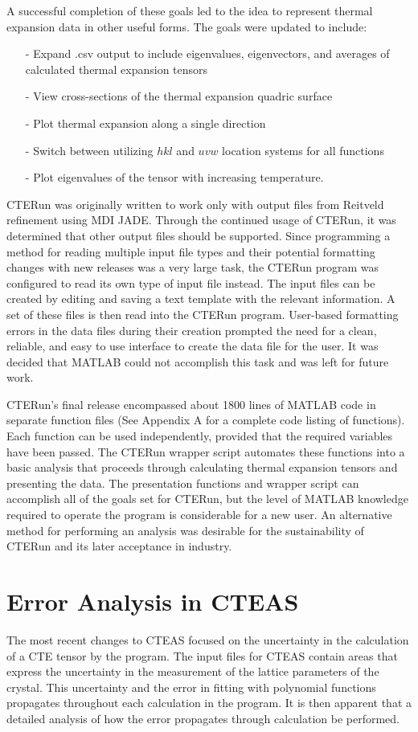 A successful completion of these goals led to the idea to represent thermal expansion data in other useful forms.  The goals were updated to include:
\begin{itemize}
 \item[-] Expand .csv output to include eigenvalues, eigenvectors, and averages of calculated thermal expansion tensors
 \item[-] View cross-sections of the thermal expansion quadric surface
 \item[-] Plot thermal expansion along a single direction
 \item[-] Switch between utilizing $hkl$ and $uvw$ location systems for all functions
 \item[-] Plot eigenvalues of the tensor with increasing temperature.
\end{itemize}

CTERun was originally written to work only with output files from Reitveld refinement using MDI JADE.  Through the continued usage of CTERun, it was determined that other output files should be supported.  Since programming a method for reading multiple input file types and their potential formatting changes with new releases was a very large task, the CTERun program was configured to read its own type of input file instead.  The input files can be created by editing and saving a text template with the relevant information.  A set of these files is then read into the CTERun program.  User-based formatting errors in the data files during their creation prompted the need for a clean, reliable, and easy to use interface to create the data file for the user.  It was decided that MATLAB could not accomplish this task and was left for future work.

CTERun's final release encompassed about 1800 lines of MATLAB code in separate function files (See Appendix A for a complete code listing of functions).  Each function can be used independently, provided that the required variables have been passed.  The CTERun wrapper script automates these functions into a basic analysis that proceeds through calculating thermal expansion tensors and presenting the data.  The presentation functions and wrapper script can accomplish all of the goals set for CTERun, but the level of MATLAB knowledge required to operate the program is considerable for a new user.  An alternative method for performing an analysis was desirable for the sustainability of CTERun and its later acceptance in industry.  

\section{Error Analysis in CTEAS}
The most recent changes to CTEAS focused on the uncertainty in the calculation of a CTE tensor by the program.  The input files for CTEAS contain areas that express the uncertainty in the measurement of the lattice parameters of the crystal.  This uncertainty and the error in fitting with polynomial functions propagates throughout each calculation in the program.  It is then apparent that a detailed analysis of how the error propagates through calculation be performed.  

